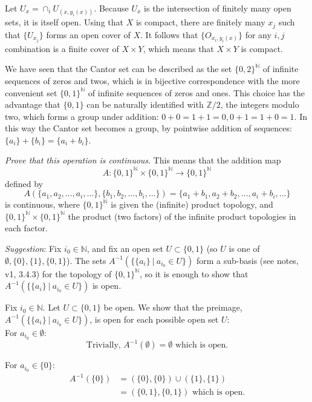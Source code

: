 \documentclass{jhwhw}
\newcommand{\Z}{{\mathbb Z}}
\newcommand{\N}{{\mathbb N}}
\begin{document}
Let $U_x = \cap_{i} U_{(x,y_i(x))}$. Because $U_x$ is the intersection of finitely many open sets, it is itself open. Using that $X$ is compact, there are finitely many $x_j$ such that $\{U_{x_j}\}$ forms an open cover of $X$. It follows that $\{O_{x_i,y_i(x)}\}$ for any $i,j$ combination is a finite cover of $X \times Y$, which means that $X \times Y$ is compact.

\problem{}%
We have seen that the Cantor set can be described as the set $\{0,2\}^\N$ of infinite sequences of zeros and twos, which is in bijective correspondence with the more convenient set $\{0,1\}^\N$ of infinite sequences of zeros and ones.  This choice has  the advantage that $\{0,1\}$ can be  naturally identified with $\Z/2$, the integers modulo two, which forms a group under addition:  $ 0 + 0 = 1+ 1 = 0, 0+1 = 1+ 0 = 1$.  In this way the Cantor set becomes a group, by pointwise addition of sequences: $\{a_i\} + \{b_i\} = \{a_i + b_i \}$.  

\emph{ Prove that this operation is continuous}. This means that the  addition  map
$$
A: \{0,1\}^\N\times\{0,1\}^\N \to \{0,1\}^\N 
$$
defined by
$$
A(\{a_1,a_2,\dots, a_i,\dots  \},\{b_1,b_2,\dots, b_i,\dots\})  = \{a_1 + b_1, a_2+b_2,\dots , a_i +b_i,\dots \}
$$
is continuous, where $\{0,1\}^\N$ is given the (infinite) product topology, and $\{0,1\}^\N\times\{0,1\}^\N$ the product (two factors) of the infinite product topologies in each factor.

\emph{Suggestion}:  Fix $i_0\in\N$, and  fix an open set $U\subset \{0,1\}$ (so  $U $ is one of $\emptyset, \{0\}, \{1\},\{0,1\}$).  The sets $A^{-1}(\{ \{a_i\} \ | \ a_{i_0}\in U\})$ form a sub-basis (see notes, v1,  3.4.3)  for the topology of $\{0,1\}^\N$, so it is enough to show that $A^{-1}(\{ \{a_i\} \ | \ a_{i_0}\in U\})$ is open.

\solution{}
Fix $i_0 \in \N$. Let $U \subset \{0,1\}$ be open. We show that the preimage, $A^{-1}(\{ \{a_i\} \ | \ a_{i_0}\in U\})$, is open for each possible open set $U$:
\\

For $a_{i_0}\in \emptyset$:
\begin{equation}
\text{Trivially, } A^{-1}(\emptyset) = \emptyset \text{ which is open.}
\end{equation}

For $a_{i_0}\in \{0\}$: 
\begin{align}A^{-1}(\{0\}) &= (\{0\},\{0\})\cup(\{1\},\{1\}) \\
&= (\{0,1\},\{0,1\}) \text{ which is open.}
\end{align}
\end{document}
